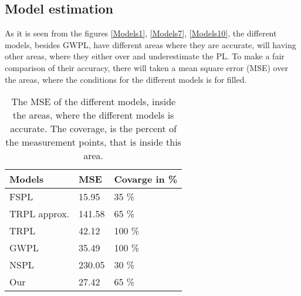 \subsection{Model estimation}

As it is seen from the figures \autoref{Models1}, \autoref{Models7}, \autoref{Models10}, the different models, besides GWPL, have different areas where they are accurate, will having other areas, where they either over and underestimate the PL. To make a fair comparison of their accuracy, there will taken a mean square error (MSE) over the areas, where the conditions for the different models is for filled.







\begin{table}[!htbp]
\centering
\begin{tabular}{|l|l|l|}
\hline
\textbf{Models} & \textbf{MSE} & \textbf{Covarge in \%} \\ \hline
FSPL            & 15.95        & 35 \%                  \\ \hline
TRPL approx.    & 141.58       & 65 \%                  \\ \hline
TRPL     		& 42.12        & 100 \%                 \\ \hline
GWPL            & 35.49        & 100 \%                 \\ \hline
NSPL            & 230.05       & 30 \%                  \\ \hline
Our             & 27.42        & 65 \%                  \\ \hline
\end{tabular}
\caption{The MSE of the different models, inside the areas, where the different models is accurate. The coverage, is the percent of the measurement points, that is inside this area.}
\label{my-label}
\end{table}






